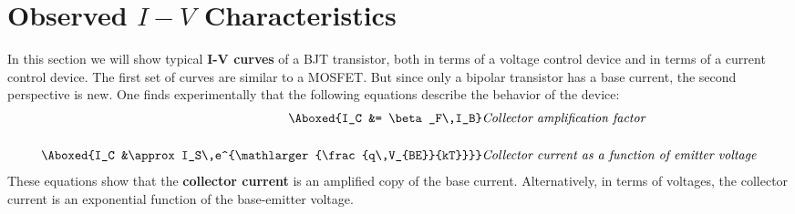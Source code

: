 \section{Observed \texorpdfstring{$I-V$}{I-V} Characteristics}
In this section we will show typical \textbf{I-V curves} of a BJT transistor, both in terms of a voltage control device and in terms of a current control device.  The first set of curves are similar to a MOSFET.  But since only a bipolar transistor has a base current, the second perspective is new.  One finds experimentally that the following equations describe the behavior of the device:
    \begin{align}
        \Aboxed{I_C &= \beta_F\,I_B} &\textit{Collector amplification factor}\\[0.5cm]
        \Aboxed{I_C &\approx I_S\,e^{\mathlarger{\frac{q\,V_{BE}}{kT}}}} &\textit{Collector current as a function of emitter voltage}
    \end{align}
These equations show that the \textbf{collector current} is an amplified copy of the base current.  Alternatively, in terms of voltages, the collector current is an exponential function of the base-emitter voltage.
